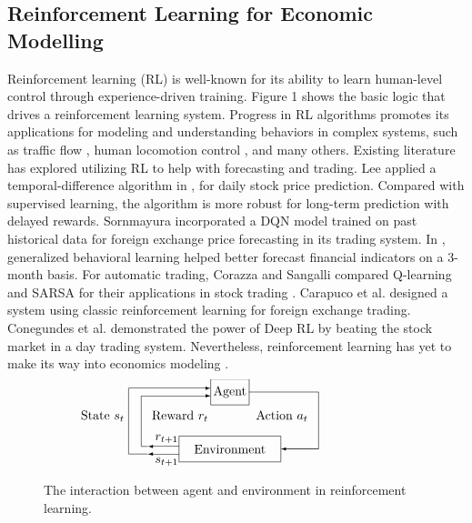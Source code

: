\documentclass{article}
\begin{document}
\subsection{Reinforcement Learning for Economic Modelling}

Reinforcement learning (RL) is well-known for its ability to learn human-level control through experience-driven training. Figure 1 shows the basic logic that drives a reinforcement learning system. Progress in RL algorithms promotes its applications for modeling and understanding behaviors in complex systems, such as traffic flow \citep{lussange2021modelling}, human locomotion control \citep{song2021deep}, and many others. Existing literature has explored utilizing RL to help with forecasting and trading. Lee applied a temporal-difference algorithm in \citep{lee2001stock}, for daily stock price prediction. Compared with supervised learning, the algorithm is more robust for long-term prediction with delayed rewards. Sornmayura \citep{sornmayura2019robust} incorporated a DQN model trained on past historical data for foreign exchange price forecasting in its trading system. In \citep{ertuugrul2018forecasting}, generalized behavioral learning helped better forecast financial indicators on a 3-month basis. For automatic trading, Corazza and Sangalli compared Q-learning and SARSA for their applications in stock trading \citep{corazza2015q}. Carapuco et al. \citep{carapucco2018reinforcement} designed a system using classic reinforcement learning for foreign exchange trading. Conegundes et al. \citep{conegundes2020beating} demonstrated the power of Deep RL by beating the stock market in a day trading system. Nevertheless, reinforcement learning has yet to make its way into economics modeling \citep{tilbury2022rl}.

\begin{figure}[h]
\[ \begin{picture}(90,60)
  \put(25, 45){\framebox(30, 20){Agent}}
  \put(0, 0){\framebox(80, 20){Environment}}
  \put(0, 12){\vector(-1, 0){25}}
  \put(-25, 12){\line(-1, 0){5}}
  \put(-30, 12){\line(0, 1){40}}
  \put(-30, 52){\vector(1, 0){55}}
  \put(-10, 18){\makebox(0, 0)[c]{$r_{t+1}$}}
  \put(-25, 36){\makebox(0, 0)[l]{\ Reward $r_t$}}
  \put(0, 6){\vector(-1, 0){25}}
  \put(-25, 6){\line(-1, 0){15}}
  \put(-40, 6){\line(0, 1){52}}
  \put(-40, 58){\vector(1, 0){65}}
  \put(-10, 0){\makebox(0, 0)[c]{$s_{t+1}$}}
  \put(-40, 36){\makebox(0, 0)[r]{State $s_t$\ }}
  \put(55, 55){\line(1, 0){55}}
  \put(110, 55){\line(0, -1){45}}
  \put(110, 10){\vector(-1, 0){30}}
  \put(105, 36){\makebox(0, 0)[r]{Action $a_t$\ }}
\end{picture}
 \]
\caption{The interaction between agent and environment in reinforcement learning.}
\label{fig:1}
\end{figure}
\end{document}
